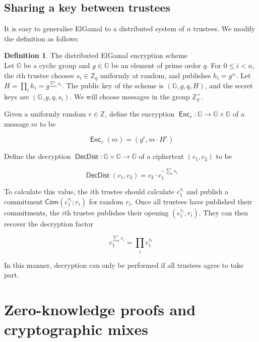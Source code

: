 \documentclass[11pt,twoside,a4paper]{article}
\DeclareMathOperator{\Enc}{\mathsf{Enc}}
\DeclareMathOperator{\DecDist}{\mathsf{DecDist}}
\newcommand{\commit}{\mathsf{Com}}
\theoremstyle{definition}
\newtheorem{definition}{Definition}[section]
\begin{document}
\subsection{Sharing a key between trustees}
It is easy to generalise ElGamal to a distributed system of \(n\) trustees. We modify the definition as follows:
\begin{definition}{The distributed ElGamal encryption scheme}\\
    Let \(\mathbb{G}\) be a cyclic group and \(g\in\mathbb{G}\) be an element of prime order \(q\). For \(0\leq i<n\), the \(i\)th trustee chooses \(s_i\in\mathbb{Z}_q\) uniformly at random, and publishes \(h_i=g^{s_i}\). Let \(H=\prod_i h_i=g^{\sum_i s_i}\). The public key of the scheme is \((\mathbb{G}, g, q, H)\), and the secret keys are \((\mathbb{G}, g, q, s_i)\). We will choose messages in the group \(\mathbb{Z}^\times_q\).

    Given a uniformly random \(r\in\mathbb{Z}\), define the encryption \(\Enc_r:\mathbb{G}\rightarrow\mathbb{G}\times\mathbb{G}\) of a message \(m\) to be
    
    \[\Enc_r(m) = (g^r, m\cdot H^r)\]

    Define the decryption \(\DecDist:\mathbb{G}\times\mathbb{G}\rightarrow \mathbb{G}\) of a ciphertext \((c_1, c_2)\) to be
    
    \[\DecDist(c_1,c_2)=c_2\cdot c_1^{-\sum_i s_i}\]
    
    To calculate this value, the \(i\)th trustee should calculate \(c_1^{s_i}\) and publish a commitment \(\commit\left(c_1^{s_i};r_i\right)\) for random \(r_i\). Once all trustees have published their commitments, the \(i\)th trustee publishes their opening \(\left(c_1^{s_i}, r_i\right)\). They can then recover the decryption factor
    
    \[c_1^{\sum_i s_i}=\prod_i{c_1^{s_i}}\]
\end{definition}
In this manner, decryption can only be performed if all trustees agree to take part.
\vfill\pagebreak
\section{Zero-knowledge proofs and cryptographic mixes}\label{app-proof}
\end{document}
